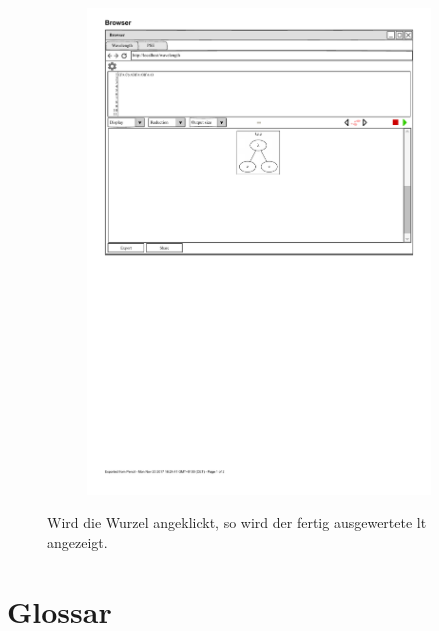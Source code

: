 \documentclass[parskip=full,11pt,twoside]{scrartcl}
\begin{document}
\begin{figure}[H]
\begin{subfigure}{0.5\textwidth}
		\includegraphics{img/displayTree5}
	\end{subfigure}
	\caption{Wird die Wurzel angeklickt, so wird der fertig ausgewertete \gls{lt} angezeigt.}
\end{figure}


\section{Glossar}

\printglossaries
\end{document}
